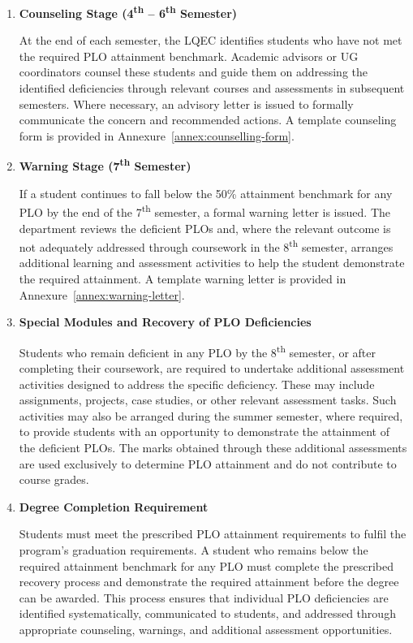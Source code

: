\begin{enumerate}
\item \textbf{Counseling Stage (4\textsuperscript{th} -- 6\textsuperscript{th} Semester)}

At the end of each semester, the LQEC identifies students who have not met the required PLO attainment benchmark. Academic advisors or UG coordinators counsel these students and guide them on addressing the identified deficiencies through relevant courses and assessments in subsequent semesters. Where necessary, an advisory letter is issued to formally communicate the concern and recommended actions. A template counseling form is provided in Annexure~\ref{annex:counselling-form}.

\item \textbf{Warning Stage (7\textsuperscript{th} Semester)}

If a student continues to fall below the 50\% attainment benchmark for any PLO by the end of the 7\textsuperscript{th} semester, a formal warning letter is issued. The department reviews the deficient PLOs and, where the relevant outcome is not adequately addressed through coursework in the 8\textsuperscript{th} semester, arranges additional learning and assessment activities to help the student demonstrate the required attainment. A template warning letter is provided in Annexure~\ref{annex:warning-letter}. 

\item \textbf{Special Modules and Recovery of PLO Deficiencies}

Students who remain deficient in any PLO by the 8\textsuperscript{th} semester, or after completing their coursework, are required to undertake additional assessment activities designed to address the specific deficiency. These may include assignments, projects, case studies, or other relevant assessment tasks. Such activities may also be arranged during the summer semester, where required, to provide students with an opportunity to demonstrate the attainment of the deficient PLOs. The marks obtained through these additional assessments are used exclusively to determine PLO attainment and do not contribute to course grades.

\item \textbf{Degree Completion Requirement}

Students must meet the prescribed PLO attainment requirements to fulfil the program’s graduation requirements. A student who remains below the required attainment benchmark for any PLO must complete the prescribed recovery process and demonstrate the required attainment before the degree can be awarded. This process ensures that individual PLO deficiencies are identified systematically, communicated to students, and addressed through appropriate counseling, warnings, and additional assessment opportunities.
\end{enumerate}

